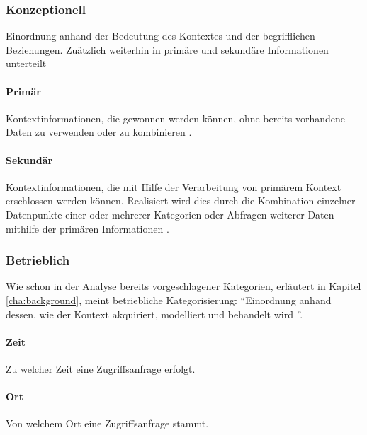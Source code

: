 \subsubsection{Konzeptionell}
Einordnung anhand der Bedeutung des Kontextes und der begrifflichen Beziehungen.
Zuätzlich weiterhin in primäre und sekundäre Informationen unterteilt
\paragraph{Primär}
Kontextinformationen, die gewonnen werden können, ohne bereits vorhandene Daten zu verwenden oder zu kombinieren \cite{abowd_towards_1999}. 
\paragraph{Sekundär}
Kontextinformationen, die mit Hilfe der Verarbeitung von primärem Kontext erschlossen werden können. Realisiert wird dies durch die Kombination einzelner Datenpunkte einer oder mehrerer Kategorien oder Abfragen weiterer Daten mithilfe der primären Informationen  \cite{abowd_towards_1999}.
\subsubsection{Betrieblich}
Wie schon in der Analyse bereits vorgeschlagener Kategorien, erläutert in Kapitel \ref{cha:background}, meint betriebliche Kategorisierung: ``Einordnung anhand dessen, wie der Kontext akquiriert, modelliert und behandelt wird ''\cite{van2005context}.
\paragraph{Zeit}
Zu welcher Zeit eine Zugriffsanfrage erfolgt.
\paragraph{Ort}
Von welchem Ort eine Zugriffsanfrage stammt.
